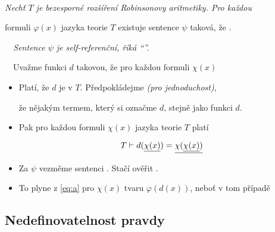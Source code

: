     {\bf {}}\ \ {\it Nechť $T$ je bezesporné rozšíření Robinsonovy aritmetiky. Pro každou
    \smallskip
    
    formuli $\varphi(x)$ jazyka teorie $T$ existuje sentence $\psi$ taková, že .}
    \medskip
    
    {\it {}\ \ Sentence $\psi$ je self-referenční, říká \emph{``''.}}
    \medskip
    
    \ \ Uvažme  funkci $d$ takovou, že pro každou formuli $\chi(x)$
    
    
    
    \begin{itemize}
    \item Platí, že $d$ je  v $T$. Předpokládejme \emph{(pro jednoduchost)},
    \smallskip
    
    že nějakým termem, který si označme $d$, stejně jako funkci $d$.
    \smallskip
    
    \item Pak pro každou formuli $\chi(x)$ jazyka teorie $T$ platí
    
    \begin{equation}\label{eq:a}{T\vdash d(\underline{\chi(x)})=\underline{\chi(\underline{\chi(x)})}}\end{equation}
    
    
    \item Za $\psi$ vezměme sentenci . Stačí ověřit .
    \smallskip
    
    \item To plyne z \eqref{eq:a} pro $\chi(x)$ tvaru $\varphi(d(x))$, neboť v tom případě
    
    
    
    \end{itemize}
    
    
    \subsection{Nedefinovatelnost pravdy}
